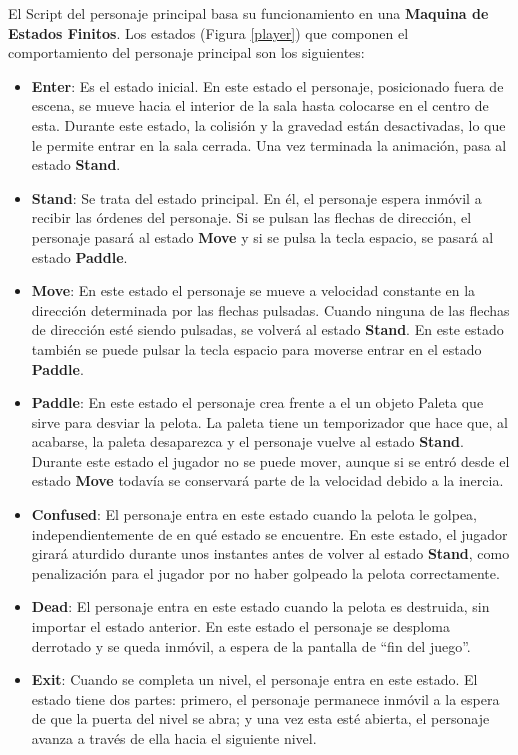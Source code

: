 El Script del personaje principal basa su funcionamiento en una \textbf{Maquina de Estados Finitos}. Los estados (Figura \ref{player}) que componen el comportamiento del personaje principal son los siguientes:
\begin{itemize}
	\item \textbf{Enter}: Es el estado inicial. En este estado el personaje, posicionado fuera de escena, se mueve hacia el interior de la sala hasta colocarse en el centro de esta. Durante este estado, la colisión y la gravedad están desactivadas, lo que le permite entrar en la sala cerrada. Una vez terminada la animación, pasa al estado \textbf{Stand}.
  	\item \textbf{Stand}: Se trata del estado principal. En él, el personaje espera inmóvil a recibir las órdenes del personaje. Si se pulsan las flechas de dirección, el personaje pasará al estado \textbf{Move} y si se pulsa la tecla espacio, se pasará al estado \textbf{Paddle}.
	\item \textbf{Move}: En este estado el personaje se mueve a velocidad constante en la dirección determinada por las flechas pulsadas. Cuando ninguna de las flechas de dirección esté siendo pulsadas, se volverá al estado \textbf{Stand}. En este estado también se puede pulsar la tecla espacio para moverse entrar en el estado \textbf{Paddle}.
	\item \textbf{Paddle}: En este estado el personaje crea frente a el un objeto Paleta que sirve para desviar la pelota. La paleta tiene un temporizador que hace que, al acabarse, la paleta desaparezca y el personaje vuelve al estado \textbf{Stand}. Durante este estado el jugador no se puede mover, aunque si se entró desde el estado \textbf{Move} todavía se conservará parte de la velocidad debido a la inercia.
	\item \textbf{Confused}: El personaje entra en este estado cuando la pelota le golpea, independientemente de en qué estado se encuentre. En este estado, el jugador girará aturdido durante unos instantes antes de volver al estado \textbf{Stand}, como penalización para el jugador por no haber golpeado la pelota correctamente.
	\item \textbf{Dead}: El personaje entra en este estado cuando la pelota es destruida, sin importar el estado anterior. En este estado el personaje se desploma derrotado y se queda inmóvil, a espera de la pantalla de ``fin del juego''.
    \item \textbf{Exit}: Cuando se completa un nivel, el personaje entra en este estado. El estado tiene dos partes: primero, el personaje permanece inmóvil a la espera de que la puerta del nivel se abra; y una vez esta esté abierta, el personaje avanza a través de ella hacia el siguiente nivel.
\end{itemize}

